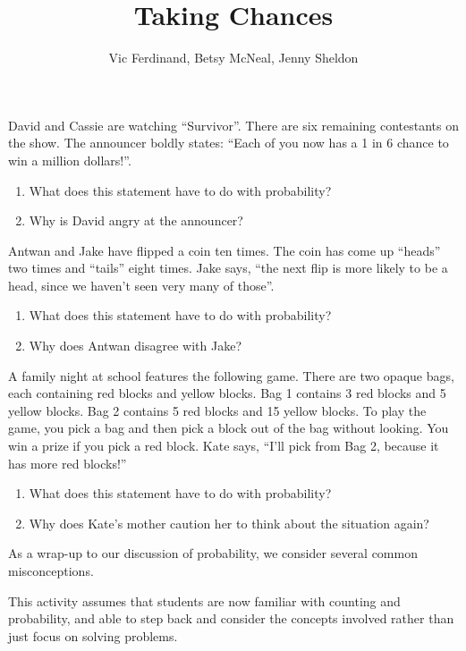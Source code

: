 \documentclass{ximera}
\title{Taking Chances}
\author{Vic Ferdinand, Betsy McNeal, Jenny Sheldon}
\begin{document}
\begin{abstract}
\end{abstract}
\maketitle



\begin{problem}
David and Cassie are watching ``Survivor''.  There are six remaining contestants on the show.  The announcer boldly states: ``Each of you now has a 1 in 6 chance to win a million dollars!''.

\begin{enumerate}
\item What does this statement have to do with probability?
\item Why is David angry at the announcer?
\end{enumerate}
\end{problem}

\begin{problem}
Antwan and Jake have flipped a coin ten times.  The coin has come up ``heads'' two times and ``tails'' eight times.  Jake says, ``the next flip is more likely to be a head, since we haven't seen very many of those''.
\begin{enumerate}
\item What does this statement have to do with probability?
\item Why does Antwan disagree with Jake?
\end{enumerate}
\end{problem}

\begin{problem}
A family night at school features the following game.  There are two opaque bags, each containing red blocks and yellow blocks.  Bag 1 contains 3 red blocks and 5 yellow blocks.  Bag 2 contains 5 red blocks and 15 yellow blocks.  To play the game, you pick a bag and then pick a block out of the bag without looking.  You win a prize if you pick a red block.  Kate says, ``I'll pick from Bag 2, because it has more red blocks!''
\begin{enumerate}
\item What does this statement have to do with probability?
\item Why does Kate's mother caution her to think about the situation again?
\end{enumerate}
\end{problem}

\newpage

\begin{instructorNotes}
As a wrap-up to our discussion of probability, we consider several common misconceptions.

This activity assumes that students are now familiar with counting and probability, and able to step back and consider the concepts involved rather than just focus on solving problems.


\end{instructorNotes}
\end{document}
